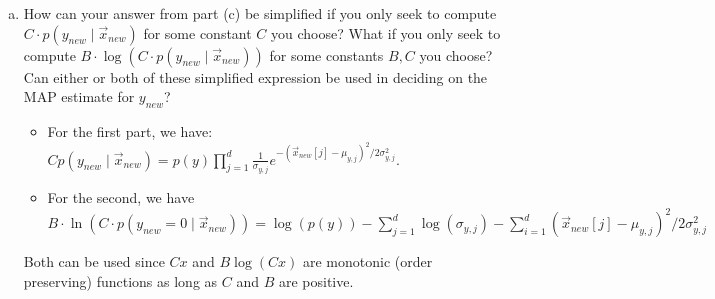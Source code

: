 \documentclass[10pt]{article}
\begin{document}
\begin{enumerate}[(a)]
	
	\item How can your answer from part (c) be simplified if you only seek to compute $C\cdot p({y}_{new}\mid \vec{x}_{new} )$ for some constant $C$ you choose? What if you only seek to compute $B\cdot\log\left(C\cdot p({y}_{new} \mid \vec{x}_{new} )\right)$ for some constants $B,C$ you choose?
	Can either or both of these simplified expression be used in deciding on the MAP estimate for $y_{new}$?
	
	\color{blue}
	\begin{itemize}
		\item For the first part, we have: $C p({y}_{new} \mid \vec{x}_{new} ) = p(y)\prod_{j=1}^d \frac{1}{\sigma_{y,j}} e^{-(\vec{x}_{new}[j]- \mu_{y,j})^2/2\sigma_{y,j}^2}$.
		\item For the second, we have $B\cdot\ln\left(C\cdot p({y}_{new}=0\mid \vec{x}_{new} )\right) = \log(p(y)) - \sum_{j=1}^d \log(\sigma_{y,j}) - \sum_{i=1}^d (\vec{x}_{new}[j]- \mu_{y,j})^2/2\sigma_{y,j}^2$
	\end{itemize}
Both can be used since $Cx$ and $B\log(Cx)$ are monotonic (order preserving) functions as long as $C$ and $B$ are positive.
	\color{black}
	
\end{enumerate}

\newpage
\end{document}
